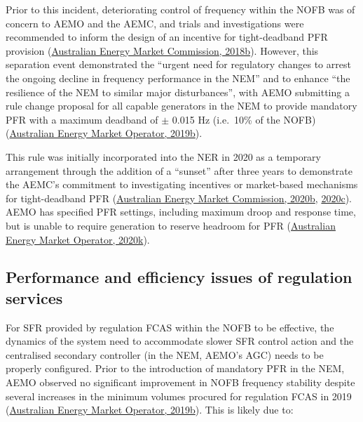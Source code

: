 \documentclass[12pt,a4paper,]{report}
\begin{document}
Prior to this incident, deteriorating control of frequency within the
NOFB was of concern to AEMO and the AEMC, and trials and investigations
were recommended to inform the design of an incentive for tight-deadband
PFR provision
(\protect\hyperlink{ref-australianenergymarketcommissionFrequencyControlFrameworks2018}{Australian
Energy Market Commission, 2018b}). However, this separation event
demonstrated the ``urgent need for regulatory changes to arrest the
ongoing decline in frequency performance in the NEM'' and to enhance
``the resilience of the NEM to similar major disturbances'', with AEMO
submitting a rule change proposal for all capable generators in the NEM
to provide mandatory PFR with a maximum deadband of \(\pm\) 0.015 Hz
(i.e.~10\% of the NOFB)
(\protect\hyperlink{ref-australianenergymarketoperatorElectricityRuleChange2019}{Australian
Energy Market Operator, 2019b}).

This rule was initially incorporated into the NER in 2020 as a temporary
arrangement through the addition of a ``sunset'' after three years to
demonstrate the AEMC's commitment to investigating incentives or
market-based mechanisms for tight-deadband PFR
(\protect\hyperlink{ref-australianenergymarketcommissionMandatoryPrimaryFrequency2020}{Australian
Energy Market Commission, 2020b},
\protect\hyperlink{ref-australianenergymarketcommissionFrequencyControlRule2020}{2020c}).
AEMO has specified PFR settings, including maximum droop and response
time, but is unable to require generation to reserve headroom for PFR
(\protect\hyperlink{ref-australianenergymarketoperatorInterimPrimaryFrequency2020}{Australian
Energy Market Operator, 2020k}).

\hypertarget{sec:fcs-regulation}{%
\subsection{Performance and efficiency issues of regulation
services}\label{sec:fcs-regulation}}

For SFR provided by regulation FCAS within the NOFB to be effective, the
dynamics of the system need to accommodate slower SFR control action and
the centralised secondary controller (in the NEM, AEMO's AGC) needs to
be properly configured. Prior to the introduction of mandatory PFR in
the NEM, AEMO observed no significant improvement in NOFB frequency
stability despite several increases in the minimum volumes procured for
regulation FCAS in 2019
(\protect\hyperlink{ref-australianenergymarketoperatorElectricityRuleChange2019}{Australian
Energy Market Operator, 2019b}). This is likely due to:
\end{document}
